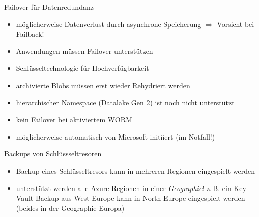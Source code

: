 \begin{flashcard}[Definition]{Failover für Datenredundanz}
  \begin{itemize}
    \item möglicherweise Datenverlust durch asynchrone Speicherung\newline
      $\Rightarrow$ Vorsicht bei Failback!    
    \item Anwendungen müssen Failover unterstützen
    \item Schlüsseltechnologie für Hochverfügbarkeit
    \item archivierte Blobs müssen erst wieder Rehydriert werden
    \item hierarchischer Namespace (Datalake Gen 2) ist noch nicht unterstützt
    \item kein Failover bei aktiviertem WORM
    \item möglicherweise automatisch von Microsoft initiiert (im Notfall!)
  \end{itemize}
\end{flashcard}

\begin{flashcard}[Definition]{Backups von Schlüssseltresoren}
  \begin{itemize}
    \item Backup eines Schlüsseltresors kann in mehreren Regionen eingespielt werden
    \item unterstützt werden alle Azure-Regionen in einer \emph{Geographie}!\newline
      z.\,B. ein Key-Vault-Backup aus West Europe kann in North Europe eingespielt werden\newline
      (beides in der Geographie Europa)
  \end{itemize}
\end{flashcard}



